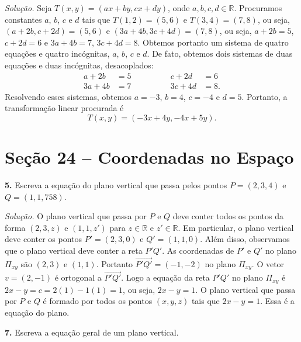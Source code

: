 \documentclass[a4paper,11pt]{article}
\newcommand{\R}{\mathbb{R}}
\begin{document}
\emph{Solução.}
Seja $T(x,y) = (ax + by, cx + dy)$, onde $a, b, c, d \in \R$.
Procuramos constantes $a$, $b$, $c$ e $d$ tais que $T(1,2) = (5,6)$ e $T(3,4) = (7,8)$, ou seja, $(a + 2b, c + 2d) = (5,6)$ e $(3a + 4b, 3c + 4d) = (7,8)$, ou seja, $a + 2b = 5$, $c + 2d = 6$ e $3a + 4b = 7$, $3c + 4d = 8$.
Obtemos portanto um sistema de quatro equações e quatro incógnitas, $a$, $b$, $c$ e $d$.
De fato, obtemos dois sistemas de duas equações e duas incógnitas, desacoplados:
\[
  \begin{aligned}
    a + 2b & = 5 \\
    3a + 4b & = 7
  \end{aligned}
  \qquad \qquad
  \begin{aligned}
    c + 2d & = 6 \\
    3c + 4d & = 8.
  \end{aligned}
\]
Resolvendo esses sistemas, obtemos $a = -3$, $b = 4$, $c = -4$ e $d = 5$.
Portanto, a transformação linear procurada é
\[
  T(x,y) = (-3x + 4y, -4x + 5y).
\]

\section*{Seção 24 -- Coordenadas no Espaço}

\textbf{5.}
Escreva a equação do plano vertical que passa pelos pontos $P\!=\!(2,3,4)$ e $Q = (1,1,758)$.

\vspace{\baselineskip}

\emph{Solução.}
O plano vertical que passa por $P$ e $Q$ deve conter todos os pontos da forma $(2,3,z)$ e $(1,1,z')$ para $z \in \R$ e $z' \in \R$.
Em particular, o plano vertical deve conter os pontos $P' = (2,3,0)$ e $Q' = (1,1,0)$.
Além disso, observamos que o plano vertical deve conter a reta $P'Q'$.
As coordenadas de $P'$ e $Q'$ no plano $\Pi_{xy}$ são $(2,3)$ e $(1,1)$.
Portanto $\overrightarrow{P'Q'} = (-1,-2)$ no plano $\Pi_{xy}$.
O vetor $v = (2,-1)$ é ortogonal a $\overrightarrow{P'Q'}$.
Logo a equação da reta $P'Q'$ no plano $\Pi_{xy}$ é $2x - y = c = 2(1) - 1(1) = 1$, ou seja, $2x - y = 1$.
O plano vertical que passa por $P$ e $Q$ é formado por todos os pontos $(x,y,z)$ tais que $2x - y = 1$.
Essa é a equação do plano.

\vspace{\baselineskip}

\textbf{7.}
Escreva a equação geral de um plano vertical.

\vspace{\baselineskip}
\end{document}
